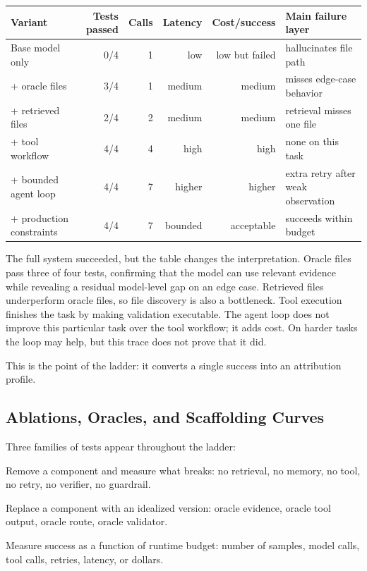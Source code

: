 \begin{center}
\small
\begin{tabularx}{\textwidth}{@{}lrrrrX@{}}
\toprule
\textbf{Variant} & \textbf{Tests passed} & \textbf{Calls} & \textbf{Latency} & \textbf{Cost/success} & \textbf{Main failure layer} \\
\midrule
Base model only & 0/4 & 1 & low & low but failed & hallucinates file path \\
+ oracle files & 3/4 & 1 & medium & medium & misses edge-case behavior \\
+ retrieved files & 2/4 & 2 & medium & medium & retrieval misses one file \\
+ tool workflow & 4/4 & 4 & high & high & none on this task \\
+ bounded agent loop & 4/4 & 7 & higher & higher & extra retry after weak observation \\
+ production constraints & 4/4 & 7 & bounded & acceptable & succeeds within budget \\
\bottomrule
\end{tabularx}
\end{center}

The full system succeeded, but the table changes the interpretation. Oracle files pass three of four tests, confirming that the model can use relevant evidence while revealing a residual model-level gap on an edge case. Retrieved files underperform oracle files, so file discovery is also a bottleneck. Tool execution finishes the task by making validation executable. The agent loop does not improve this particular task over the tool workflow; it adds cost. On harder tasks the loop may help, but this trace does not prove that it did.

This is the point of the ladder: it converts a single success into an attribution profile.

\subsection{Ablations, Oracles, and Scaffolding Curves}

Three families of tests appear throughout the ladder:

\begin{description}[leftmargin=1.5em]
  \item[Ablations.] Remove a component and measure what breaks: no retrieval, no memory, no tool, no retry, no verifier, no guardrail.
  \item[Oracles.] Replace a component with an idealized version: oracle evidence, oracle tool output, oracle route, oracle validator.
  \item[Scaffolding curves.] Measure success as a function of runtime budget: number of samples, model calls, tool calls, retries, latency, or dollars.
\end{description}

